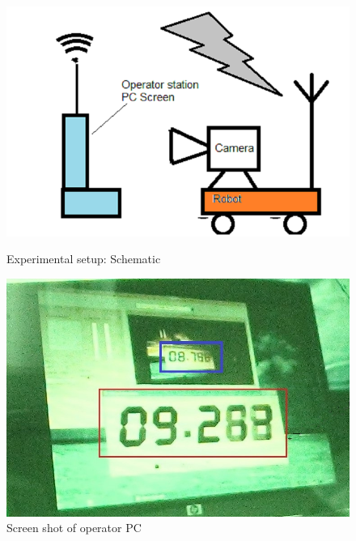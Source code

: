 \begin{figure}
	\begin{minipage}[t]{0.6\textwidth}
		\centering
		\includegraphics[width=\linewidth,scale=2]{Misc_end/fig/DelayExptSetup2}
		\caption{Experimental setup: Schematic}\label{fig:ExptSetup}
	\end{minipage}
	\hfill
	\begin{minipage}[t]{0.5\textwidth}
		\centering
		\includegraphics[width=\linewidth]{Misc_end/fig/delayMeasureNew2} 
		\caption{Screen shot of operator PC}\label{fig:ScreenShot}
	\end{minipage}
\end{figure}

